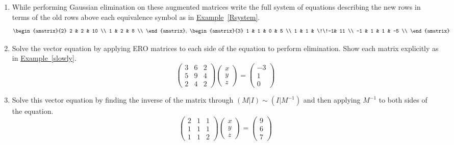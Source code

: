 


\begin{enumerate}

\item While performing  Gaussian elimination on these augmented matrices write the full system of equations describing the new rows in terms of the old rows above each equivalence symbol as in  \hyperlink{Keeping track of EROs with equations between rows}{Example}~\ref{Rsystem}. 
\[
\begin{amatrix}{2} 
2 & 2 & 10 \\
1 & 2 & 8 \\
\end{amatrix}
,~
\begin{amatrix}{3} 
1 & 1 & 0 & 5 \\
1 & 1 & \!\!-1& 11 \\
-1 & 1 & 1 & -5 \\ 
\end{amatrix}
\]


\item Solve the vector equation by applying ERO matrices to each side of the equation to perform elimination. Show each matrix explicitly as in \hyperlink{Undoing}{Example~\ref{slowly}}.
\[
\begin{pmatrix}
3	&6 	&2 \\ %
5 	&9 	&4 \\ %
2	&4	&2 %
\end{pmatrix} 
\begin{pmatrix}
 x \\ 
y \\
z 
\end{pmatrix} 
=
\begin{pmatrix}
-3 \\ 
1  \\
0 
\end{pmatrix} 
\]


\item Solve this vector equation by finding the inverse of the matrix through $(M|I)\sim (I|M^{-1})$ and then applying $M^{-1}$ to both sides of the equation. 
\[
\begin{pmatrix}
2	&1 	&1 \\ %
1 	&1 	&1 \\ %
1	&1	&2 %
\end{pmatrix} 
\begin{pmatrix}
 x \\ 
y \\
z 
\end{pmatrix} 
=
\begin{pmatrix}
9 \\ 
6  \\
7 
\end{pmatrix} 
\]



\end{enumerate}
